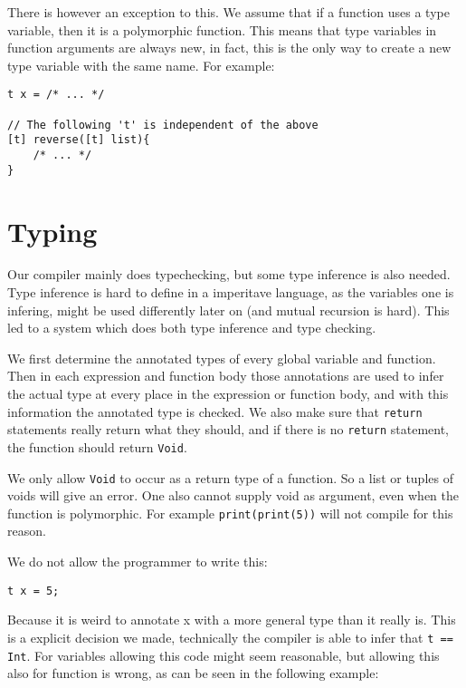 \documentclass[14pt]{amsart}
\begin{document}
There is however an exception to this. We assume that if a function uses a type variable, then it is a polymorphic function. This means that type variables in function arguments are always new, in fact, this is the only way to create a new type variable with the same name. For example:

\begin{lstlisting}
t x = /* ... */

// The following 't' is independent of the above
[t] reverse([t] list){
	/* ... */
}
\end{lstlisting}

\section{Typing}

Our compiler mainly does typechecking, but some type inference is also needed. Type inference is hard to define in a imperitave language, as the variables one is infering, might be used differently later on (and mutual recursion is hard). This led to a system which does both type inference and type checking.

We first determine the annotated types of every global variable and function. Then in each expression and function body those annotations are used to infer the actual type at every place in the expression or function body, and with this information the annotated type is checked. We also make sure that \texttt{return} statements really return what they should, and if there is no \texttt{return} statement, the function should return \texttt{Void}.

We only allow \texttt{Void} to occur as a return type of a function. So a list or tuples of voids will give an error. One also cannot supply void as argument, even when the function is polymorphic. For example \texttt{print(print(5))} will not compile for this reason.

We do not allow the programmer to write this:

\begin{lstlisting}
t x = 5;
\end{lstlisting}

Because it is weird to annotate x with a more general type than it really is. This is a explicit decision we made, technically the compiler is able to infer that \texttt{t == Int}. For variables allowing this code might seem reasonable, but allowing this also for function is wrong, as can be seen in the following example:
\end{document}
